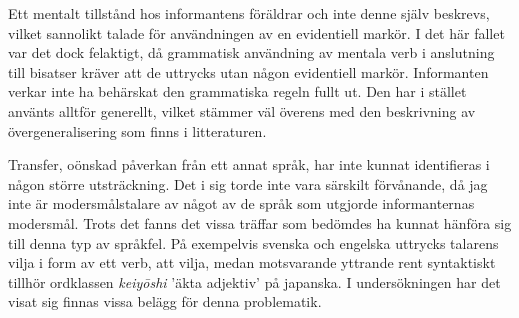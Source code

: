\documentclass[12pt,a4paper]{article}
\begin{document}
\begin{exe}
\end{exe}

\noindent
Ett mentalt tillstånd hos informantens föräldrar och inte denne själv beskrevs, vilket sannolikt talade för användningen av en evidentiell markör. I det här fallet var det dock felaktigt, då grammatisk användning av mentala verb i anslutning till bisatser kräver att de uttrycks utan någon evidentiell markör. Informanten verkar inte ha behärskat den grammatiska regeln fullt ut. Den har i stället använts alltför generellt, vilket stämmer väl överens med den beskrivning av övergeneralisering som finns i litteraturen.

Transfer, oönskad påverkan från ett annat språk, har inte kunnat identifieras i någon större utsträckning. Det i sig torde inte vara särskilt förvånande, då jag inte är modersmålstalare av något av de språk som utgjorde informanternas modersmål. Trots det fanns det vissa träffar som bedömdes ha kunnat hänföra sig till denna typ av språkfel. På exempelvis svenska och engelska uttrycks talarens vilja i form av ett verb, att vilja, medan motsvarande yttrande rent syntaktiskt tillhör ordklassen \emph{keiy\=oshi} 'äkta adjektiv' på japanska. I undersökningen har det visat sig finnas vissa belägg för denna problematik.

\begin{exe}
\end{exe}

\begin{exe}
\end{exe}
\end{document}
